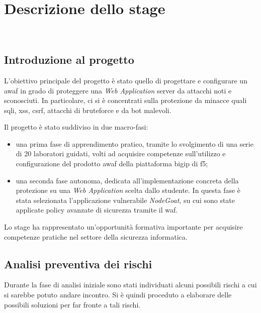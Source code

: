 \chapter{Descrizione dello stage}
\label{cap:descrizione-stage}

\\

\section{Introduzione al progetto} 

L'obiettivo principale del progetto è stato quello di progettare e configurare un \gls{awaf} in grado di proteggere una \emph{Web Application} server da attacchi noti e sconosciuti. In particolare, ci si è concentrati sulla protezione da minacce quali \gls{sqli}, \gls{xss}, \gls{csrf}, attacchi di \gls{bruteforce} e da \gls{bot} malevoli.

Il progetto è stato suddiviso in due macro-fasi:

\begin{itemize}
    \item una prima fase di apprendimento pratico, tramite lo svolgimento di una serie di 20 laboratori guidati, volti ad acquisire competenze sull'utilizzo e configurazione del prodotto \gls{awaf} della piattaforma \gls{bigip} di \gls{f5};
    \item una seconda fase autonoma, dedicata all'implementazione concreta della protezione su una \emph{Web Application} scelta dallo studente. In questa fase è stata selezionata l'applicazione vulnerabile \emph{NodeGoat}, su cui sono state applicate policy avanzate di sicurezza tramite il \gls{waf}.
\end{itemize}

Lo stage ha rappresentato un'opportunità formativa importante per acquisire competenze pratiche nel settore della sicurezza informatica.

\section{Analisi preventiva dei rischi}

Durante la fase di analisi iniziale sono stati individuati alcuni possibili rischi a cui si sarebbe potuto andare incontro. Si è quindi proceduto a elaborare delle possibili soluzioni per far fronte a tali rischi.\\

